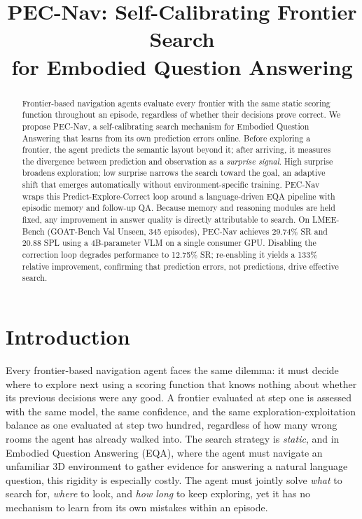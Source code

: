 \documentclass[10pt,twocolumn,letterpaper]{article}
\begin{document}
\title{PEC-Nav: Self-Calibrating Frontier Search\\for Embodied Question Answering}

\maketitle
\thispagestyle{empty}

\begin{abstract}
Frontier-based navigation agents evaluate every frontier with the same static scoring function throughout an episode, regardless of whether their decisions prove correct. We propose PEC-Nav, a self-calibrating search mechanism for Embodied Question Answering that learns from its own prediction errors online. Before exploring a frontier, the agent predicts the semantic layout beyond it; after arriving, it measures the divergence between prediction and observation as a \emph{surprise signal}. High surprise broadens exploration; low surprise narrows the search toward the goal, an adaptive shift that emerges automatically without environment-specific training. PEC-Nav wraps this Predict-Explore-Correct loop around a language-driven EQA pipeline with episodic memory and follow-up QA. Because memory and reasoning modules are held fixed, any improvement in answer quality is directly attributable to search. On LMEE-Bench (GOAT-Bench Val Unseen, 345 episodes), PEC-Nav achieves 29.74\% SR and 20.88 SPL using a 4B-parameter VLM on a single consumer GPU. Disabling the correction loop degrades performance to 12.75\% SR; re-enabling it yields a 133\% relative improvement, confirming that prediction errors, not predictions, drive effective search.
\end{abstract}

\section{Introduction}

Every frontier-based navigation agent faces the same dilemma: it must decide where to explore next using a scoring function that knows nothing about whether its previous decisions were any good. A frontier evaluated at step one is assessed with the same model, the same confidence, and the same exploration-exploitation balance as one evaluated at step two hundred, regardless of how many wrong rooms the agent has already walked into. The search strategy is \emph{static}, and in Embodied Question Answering (EQA), where the agent must navigate an unfamiliar 3D environment to gather evidence for answering a natural language question, this rigidity is especially costly. The agent must jointly solve \emph{what} to search for, \emph{where} to look, and \emph{how long} to keep exploring, yet it has no mechanism to learn from its own mistakes within an episode.
\end{document}
